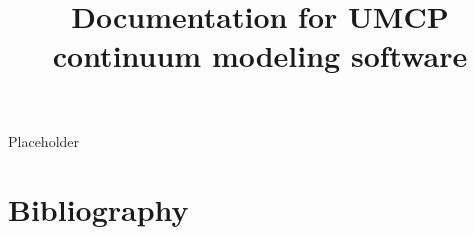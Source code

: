 \documentclass[11pt,notitlepage]{revtex4}
\begin{document}

\title{ Documentation for UMCP continuum modeling software}

\maketitle



Placeholder~\cite{Lebowitz1965}

\section{Bibliography}

\end{document}
